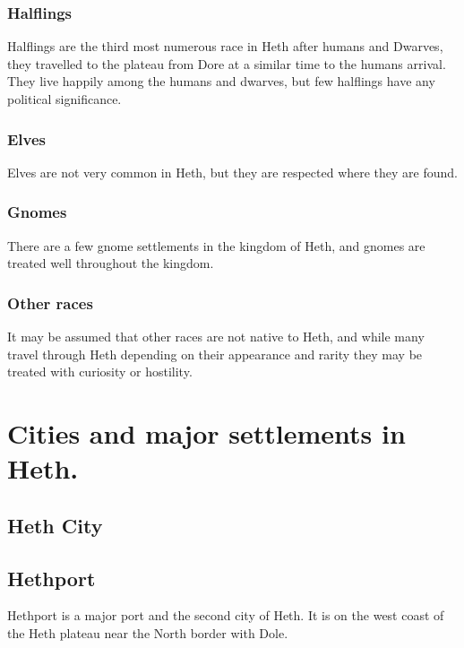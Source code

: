 \documentclass[10pt,twoside,twocolumn,openany,justified,bg=full,nomultitoc]{dndbook}
\begin{document}
\subsubsection{Halflings}
\label{sec-2-2-4-2}
Halflings are the third most numerous race in Heth after humans and Dwarves, they travelled to the plateau from Dore at a similar time to the humans arrival. They live happily among the humans and dwarves, but few halflings have any political significance.  

\subsubsection{Elves}
\label{sec-2-2-4-3}
Elves are not very common in Heth, but they are respected where they are found.  

\subsubsection{Gnomes}
\label{sec-2-2-4-4}
There are a few gnome settlements in the kingdom of Heth, and gnomes are treated well throughout the kingdom. 

\subsubsection{Other races}
\label{sec-2-2-4-5}
It may be assumed that other races are not native to Heth, and while many travel through Heth depending on their appearance and rarity they may be treated with curiosity or hostility.

\section{Cities and major settlements in Heth.}
\label{sec-2-3}
\subsection{Heth City}
\label{sec-2-3-1}

\subsection{Hethport}
\label{sec-2-3-2}
Hethport is a major port  and the second city of Heth. It is on the west coast of the Heth plateau near the North border with Dole. 
\end{document}
